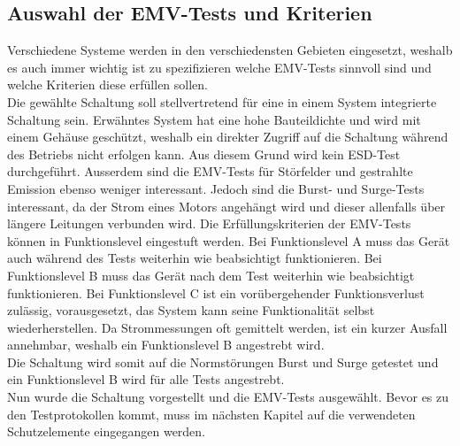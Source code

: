 \subsection{Auswahl der EMV-Tests und Kriterien}
Verschiedene Systeme werden in den verschiedensten Gebieten eingesetzt, weshalb es auch immer wichtig ist zu spezifizieren welche EMV-Tests sinnvoll sind und welche Kriterien diese erfüllen sollen.\\[0.25cm]
Die gewählte Schaltung soll stellvertretend für eine in einem System integrierte Schaltung sein. Erwähntes System hat eine hohe Bauteildichte und wird mit einem Gehäuse geschützt, weshalb ein direkter Zugriff auf die Schaltung während des Betriebs nicht erfolgen kann. Aus diesem Grund wird kein ESD-Test durchgeführt. Ausserdem sind die EMV-Tests für Störfelder und gestrahlte Emission ebenso weniger interessant. Jedoch sind die Burst- und Surge-Tests interessant, da der Strom eines Motors angehängt wird und dieser allenfalls über längere Leitungen verbunden wird.\newline
Die Erfüllungskriterien der EMV-Tests können in Funktionslevel eingestuft werden. Bei Funktionslevel A muss das Gerät auch während des Tests weiterhin wie beabsichtigt funktionieren. Bei Funktionslevel B muss das Gerät nach dem Test weiterhin wie beabsichtigt funktionieren. Bei Funktionslevel C ist ein vorübergehender Funktionsverlust zulässig, vorausgesetzt, das System kann seine Funktionalität selbst wiederherstellen.\newline
Da Strommessungen oft gemittelt werden, ist ein kurzer Ausfall annehmbar, weshalb ein Funktionslevel B angestrebt wird.\\[0.25cm]
Die Schaltung wird somit auf die Normstörungen Burst und Surge getestet und ein Funktionslevel B wird für alle Tests angestrebt.\\

Nun wurde die Schaltung vorgestellt und die EMV-Tests ausgewählt. Bevor es zu den Testprotokollen kommt, muss im nächsten Kapitel auf die verwendeten Schutzelemente eingegangen werden.